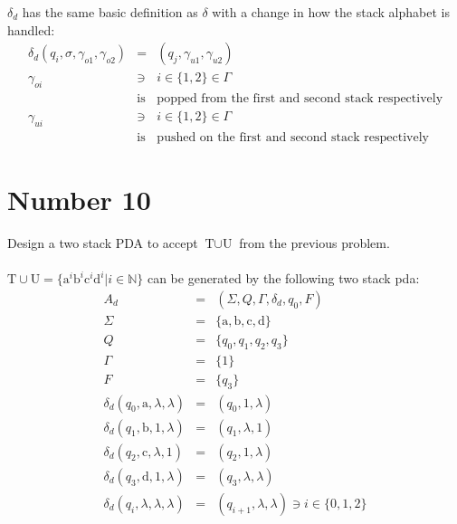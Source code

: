 \documentclass[12pt,a4paper,twoside]{article}  %
\begin{document}
$\delta_d$ has the same basic definition as $\delta$ with a change in
how the stack alphabet is handled:
\begin{eqnarray}
\delta_d(q_i, \sigma, \gamma_{o1}, \gamma_{o2}) &=& (q_j, \gamma_{u1},
  \gamma_{u2}) \\
\gamma_{oi} &\ni& i \in \{1,2\} \in \Gamma \nonumber\\
            &\textrm{is}& \textrm{popped from the first and second
  stack respectively} \nonumber\\ 
\gamma_{ui} &\ni& i \in \{1,2\} \in \Gamma \nonumber\\
            &\textrm{is}& \textrm{pushed on the first and second stack
  respectively} \nonumber
\end{eqnarray}

\section{Number 10}

Design a two stack PDA to accept $\textrm{T} \cup \textrm{U}$ from the
previous problem.\\\\
$\textrm{T} \cup \textrm{U} =
\{\textrm{a}^i\textrm{b}^i\textrm{c}^i\textrm{d}^i | i \in
\mathbb{N}\}$ can be generated by the following two stack pda:
\begin{eqnarray}
A_d    &=& (\Sigma, Q, \Gamma, \delta_d, q_0, F) \\
\Sigma &=& \{\textrm{a}, \textrm{b}, \textrm{c}, \textrm{d}\} \\
Q      &=& \{q_0, q_1, q_2, q_3\} \\
\Gamma &=& \{1\} \\
F      &=& \{q_3\} \\
\delta_d(q_0, \textrm{a}, \lambda, \lambda) &=& (q_0, 1, \lambda) \\
\delta_d(q_1, \textrm{b}, 1, \lambda) &=& (q_1, \lambda, 1) \\
\delta_d(q_2, \textrm{c}, \lambda, 1) &=& (q_2, 1, \lambda) \\
\delta_d(q_3, \textrm{d}, 1, \lambda) &=& (q_3, \lambda, \lambda) \\
\delta_d(q_i, \lambda, \lambda, \lambda) &=& (q_{i+1}, \lambda, \lambda)
  \ni i \in \{0, 1, 2\}
\end{eqnarray}
\end{document}
